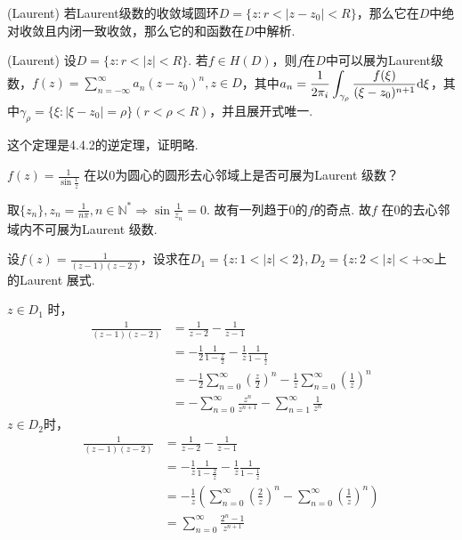 \begin{mypro}
	\color{blue}
	({\rm Laurent})
	\color{black}
	若{\rm Laurent}级数的收敛域圆环$\displaystyle{D = \{z: r< \vert z - z_0 \vert < R \}}$，那么它在$\displaystyle{D}$中绝对收敛且内闭一致收敛，那么它的和函数在$\displaystyle{D}$中解析.
\end{mypro}

\begin{mypro}
	\color{blue}
	({\rm Laurent})
	\color{black}
	设$\displaystyle{D=\{z : r < \vert z \vert < R\}}$. 若$\displaystyle{f \in H(D)}$，则$\displaystyle{f}$在$\displaystyle{D }$中可以展为{\rm Laurent}级数，$\displaystyle{f(z)=\sum_{n = -\infty}^{\infty} a_n(z - z_0)^n}, z \in D$，其中$\displaystyle{a_n = \frac{1}{2\pi_i}  \int_{\gamma_\rho} \frac{f(\xi)} {(\xi - z_0)^{n+1}} \mathrm{d}\xi }$，其中$\displaystyle{\gamma_\rho = \{ \xi : \vert \xi - z_0 \vert  = \rho \} (r < \rho < R)}$，并且展开式唯一.
	
	这个定理是4.4.2的逆定理，证明略.
\end{mypro}


\begin{eg}
	\color{blue}
	$\displaystyle{f(z) = \frac{1}{\sin \frac{1}{z}}}$ 在以0为圆心的圆形去心邻域上是否可展为{\rm Laurent } 级数？
	\color{black}
\end{eg}
\begin{jie}
	
	取$\displaystyle{\{z_n\}, z_n = \frac{1}{n\pi}, n \in \mathbb{N} ^* \Rightarrow \sin \frac{1}{z_n} = 0}$. 故有一列趋于0的$\displaystyle{f}$的奇点. 故$\displaystyle{f}$ 在0的去心邻域内不可展为{\rm Laurent } 级数.
\end{jie}

\begin{eg}
	\color{blue}
	设$\displaystyle{f(z)=\frac{1}{(z-1)(z-2)}}$，设求在$\displaystyle{D_1 = \{ z : 1 < \vert z \vert < 2\}, D_2 = \{ z : 2 < \vert z \vert < + \infty}$上的{\rm Laurent} 展式.
	\color{black}
\end{eg}
\begin{jie}
	
	$\displaystyle{z \in D_1}$ 时，
	\begin{align*}
	\frac{1}{(z-1)(z-2)} &= \frac{1}{z-2} - \frac{1}{z-1} \\
	&= -\frac{1}{2} \frac{1}{1 - \frac{z}{2}} - \frac{1}{z} \frac{1}{1 - \frac{1}{z}}\\
	&= -\frac{1}{2} \sum_{n=0}^{\infty} (\frac{z}{2})^n - \frac{1}{z} \sum_{n=0}^{\infty} (\frac{1}{z})^n\\
	&=-\sum_{n=0}^{\infty} \frac{z^n}{z^{n+1}} - \sum_{n=1}^{\infty} \frac{1}{z^n}
	\end{align*}
	$\displaystyle{z \in D_2}$时，
	\begin{align*}
	\frac{1}{(z-1)(z-2)} &= \frac{1}{z-2} - \frac{1}{z-1} \\
	&= -\frac{1}{z} \frac{1}{1 - \frac{2}{z}} - \frac{1}{z} \frac{1}{1 - \frac{1}{z}}\\
	&= -\frac{1}{z}( \sum_{n=0}^{\infty} (\frac{2}{z})^n -\sum_{n=0}^{\infty} (\frac{1}{z})^n)\\
	&= \sum_{n=0}^{\infty} \frac{2^n - 1}{z^{n+1}}
	\end{align*}		
	
\end{jie}

